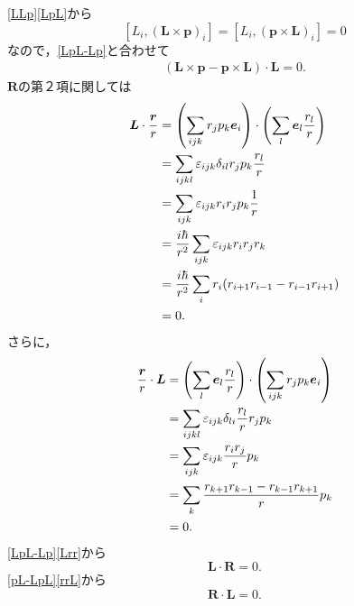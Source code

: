 \eqref{LLp}\eqref{LpL}から
\[[L_i,(\boldsymbol{L}\times\boldsymbol{p})_i]=[L_i,(\boldsymbol{p}\times\boldsymbol{L})_i]=0\]
なので，\eqref{LpL-Lp}と合わせて
\begin{align}
  (\boldsymbol{L}\times\boldsymbol{p} - \boldsymbol{p}\times\boldsymbol{L})\cdot\boldsymbol{L}=0.\label{pL-LpL}
\end{align}
$\boldsymbol{R}$の第２項に関しては
\begin{align}
  \boldsymbol{L}\cdot\frac{\boldsymbol{r}}{r} & = \left(\sum_{ijk}r_jp_k\boldsymbol{e}_i\right)\cdot\left(\sum_l\boldsymbol{e}_l\frac{r_l}{r}\right)\notag\\
  & = \sum_{ijkl}\varepsilon_{ijk}\delta_{il}r_jp_k\frac{r_l}{r}\notag\\
  & = \sum_{ijk}\varepsilon_{ijk}r_ir_jp_k\frac{1}{r}\notag\\
  & = \frac{i\hbar}{r^2}\sum_{ijk}\varepsilon_{ijk}r_ir_jr_k\notag\\
  & = \frac{i\hbar}{r^2}\sum_ir_i(r_{i + 1}r_{i - 1} - r_{i - 1}r_{i + 1})\notag\\
  & = 0.\label{Lrr}
\end{align}
さらに，
\begin{align}
  \frac{\boldsymbol{r}}{r}\cdot\boldsymbol{L} & = \left(\sum_l\boldsymbol{e}_l\frac{r_l}{r}\right)\cdot\left(\sum_{ijk}r_jp_k\boldsymbol{e}_i\right)\notag\\
  & = \sum_{ijkl}\varepsilon_{ijk}\delta_{li}\frac{r_l}{r}r_jp_k\notag\\
  & = \sum_{ijk}\varepsilon_{ijk}\frac{r_ir_j}{r}p_k\notag\\
  & = \sum_k\frac{r_{k + 1}r_{k - 1} - r_{k - 1}r_{k + 1}}{r}p_k\notag\\
  & = 0.\label{rrL}
\end{align}
\eqref{LpL-Lp}\eqref{Lrr}から
\[\boldsymbol{L}\cdot\boldsymbol{R}=0.\]
\eqref{pL-LpL}\eqref{rrL}から
\[\boldsymbol{R}\cdot\boldsymbol{L}=0.\]

